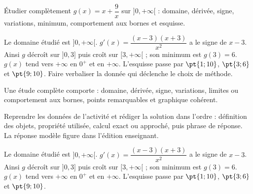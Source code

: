 \begin{activity}
Étudier complètement $g(x)=x+\dfrac9x$ sur $]0,+\infty[$ : domaine, dérivée, signe, variations, minimum, comportement aux bornes et esquisse.
\begin{center}\end{center}
\end{activity}
\begin{solution}Le domaine étudié est $]0,+\infty[$. $g'(x)=\dfrac{(x-3)(x+3)}{x^2}$ a le signe de $x-3$. Ainsi $g$ décroît sur $]0,3]$ puis croît sur $[3,+\infty[$ ; son minimum est $g(3)=6$. $g(x)$ tend vers $+\infty$ en $0^+$ et en $+\infty$. L'esquisse passe par $\pt{1;10}$, $\pt{3;6}$ et $\pt{9;10}$. Faire verbaliser la donnée qui déclenche le choix de méthode.\end{solution}

\begin{summary}Une étude complète comporte : domaine, dérivée, signe, variations, limites ou comportement aux bornes, points remarquables et graphique cohérent.\end{summary}

\begin{example}
Reprendre les données de l'activité et rédiger la solution dans l'ordre : définition des objets, propriété utilisée, calcul exact ou approché, puis phrase de réponse. La réponse modèle figure dans l'édition enseignant.
\end{example}
\begin{solution}Le domaine étudié est $]0,+\infty[$. $g'(x)=\dfrac{(x-3)(x+3)}{x^2}$ a le signe de $x-3$. Ainsi $g$ décroît sur $]0,3]$ puis croît sur $[3,+\infty[$ ; son minimum est $g(3)=6$. $g(x)$ tend vers $+\infty$ en $0^+$ et en $+\infty$. L'esquisse passe par $\pt{1;10}$, $\pt{3;6}$ et $\pt{9;10}$.\end{solution}

